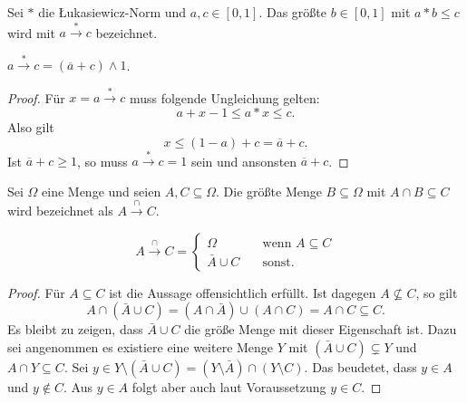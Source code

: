 \documentclass{article}
\begin{document}
\begin{definition}
  Sei $\ast$ die Łukasiewicz-Norm und $a, c \in [0, 1]$.
  Das größte $b \in [0, 1]$ mit $a \ast b \leq c$ wird mit $a \overset{\ast}{\rightarrow} c$ bezeichnet.
\end{definition}

\begin{theorem}
  $a \overset{\ast}{\rightarrow} c = (\overline{a} + c) \wedge 1$.
\end{theorem}
\begin{proof}
  Für $x = a \overset{\ast}{\rightarrow} c$ muss folgende Ungleichung gelten:
  \begin{equation*}
    a + x - 1 \leq a \ast x \leq c.
  \end{equation*}
  Also gilt
  \begin{equation*}
    x \leq (1 - a) + c = \overline{a} + c.
  \end{equation*}
  Ist $\overline{a} + c \geq 1$, so muss $a \overset{\ast}{\rightarrow} c = 1$ sein und ansonsten $\overline{a} + c$.
\end{proof}

\begin{definition}
  Sei $\Omega$ eine Menge und seien $A, C \subseteq \Omega$. 
  Die größte Menge $B \subseteq \Omega$ mit $A \cap B \subseteq C$ wird bezeichnet als $A \overset{\cap}{\rightarrow} C$.
\end{definition}
\begin{theorem}
  \[   
  A \overset{\cap}{\rightarrow} C = 
    \begin{cases}
      \Omega &\quad\text{wenn } A \subseteq C \\
      \bar{A} \cup C &\quad\text{sonst.}
    \end{cases}
  \]
\end{theorem}
\begin{proof}
  Für $A \subseteq C$ ist die Aussage offensichtlich erfüllt.
  Ist dagegen $A \nsubseteq C$, so gilt
  \begin{equation*}
    A \cap (\bar{A} \cup C) = (A \cap \bar{A}) \cup (A \cap C) = A \cap C \subseteq C.
  \end{equation*}
  Es bleibt zu zeigen, dass $\bar{A} \cup C$ die größe Menge mit dieser Eigenschaft ist.
  Dazu sei angenommen es existiere eine weitere Menge $Y$ mit $(\bar{A} \cup C) \subsetneq Y$
  und $A \cap Y \subseteq C$.
  Sei $y \in Y \setminus (\bar{A} \cup C) = (Y \setminus \bar{A}) \cap (Y \setminus C)$.
  Das beudetet, dass $y \in A$ und $y \notin C$.
  Aus $y \in A$ folgt aber auch laut Voraussetzung $y \in C$.
\end{proof}
\end{document}
